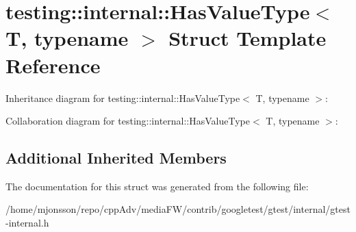 \hypertarget{structtesting_1_1internal_1_1HasValueType}{}\section{testing\+:\+:internal\+:\+:Has\+Value\+Type$<$ T, typename $>$ Struct Template Reference}
\label{structtesting_1_1internal_1_1HasValueType}


Inheritance diagram for testing\+:\+:internal\+:\+:Has\+Value\+Type$<$ T, typename $>$\+:


Collaboration diagram for testing\+:\+:internal\+:\+:Has\+Value\+Type$<$ T, typename $>$\+:
\subsection*{Additional Inherited Members}


The documentation for this struct was generated from the following file\+:\begin{DoxyCompactItemize}
\item 
/home/mjonsson/repo/cpp\+Adv/media\+F\+W/contrib/googletest/gtest/internal/gtest-\/internal.\+h\end{DoxyCompactItemize}
